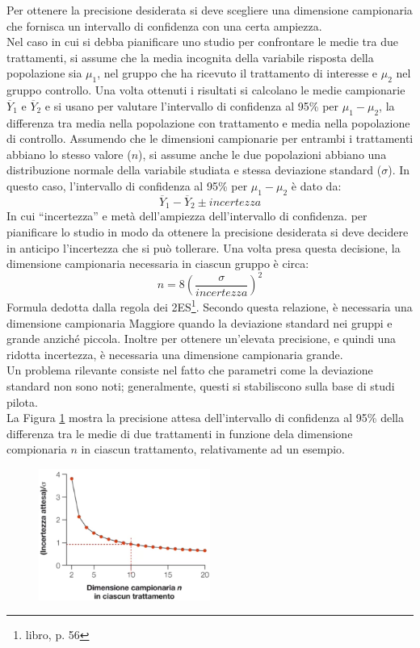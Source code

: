\documentclass[10pt, draft]{book}
\begin{document}
Per ottenere la precisione desiderata si deve scegliere una dimensione campionaria che fornisca un intervallo di confidenza con una certa ampiezza.\\
Nel caso in cui si debba pianificare uno studio per confrontare le medie tra due trattamenti, si assume che la media incognita della variabile risposta della popolazione sia $\mu_1$, nel gruppo che ha ricevuto il trattamento di interesse e $\mu_2$ nel gruppo controllo. Una volta ottenuti i risultati si calcolano le medie campionarie $\overline{Y}_1$ e $\overline{Y}_2$ e si usano per valutare l'intervallo di confidenza al 95\% per $\mu_1 - \mu_2$, la differenza tra media nella popolazione con trattamento e media nella popolazione di controllo. Assumendo che le dimensioni campionarie per entrambi i trattamenti abbiano lo stesso valore ($n$), si assume anche le due popolazioni abbiano una distribuzione normale della variabile studiata e stessa deviazione standard ($\sigma$). In questo caso, l'intervallo di confidenza al 95\% per $\mu_1 - \mu_2$ è dato da:
\begin{equation}
    \overline{Y}_1 - \overline{Y}_2 \pm incertezza
\end{equation}
In cui ``incertezza'' e metà dell'ampiezza dell'intervallo di confidenza. per pianificare lo studio in modo da ottenere la precisione desiderata si deve decidere in anticipo l'incertezza che si può tollerare. Una volta presa questa decisione, la dimensione campionaria necessaria in ciascun gruppo è circa:
\begin{equation}
    n = 8 \left(\frac{\sigma}{incertezza}\right)^2   
\end{equation}
Formula dedotta dalla regola dei 2ES\footnote{libro, p. 56}. Secondo questa relazione, è necessaria una dimensione campionaria Maggiore quando la deviazione standard nei gruppi e grande anziché piccola. Inoltre per ottenere un'elevata precisione, e quindi una ridotta incertezza, è necessaria una dimensione campionaria grande.\\
Un problema rilevante consiste nel fatto che parametri come la deviazione standard non sono noti; generalmente, questi si stabiliscono sulla base di studi pilota.\\
La Figura \ref{fig14.7-1} mostra la precisione attesa dell'intervallo di confidenza al 95\% della differenza tra le medie di due trattamenti in funzione dela dimensione compionaria $n$ in ciascun trattamento, relativamente ad un esempio.
\begin{figure}[H]
    \centering
    \includegraphics[width=0.5\textwidth]{fig14.7-1}
    \caption{\small{}}
    \label{fig14.7-1}
\end{figure}
\end{document}
